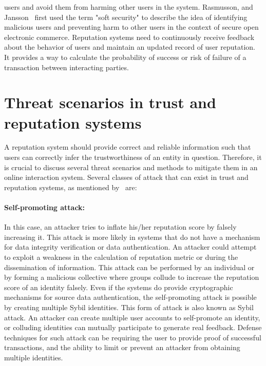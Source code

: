 users and avoid them from harming other users in the system. Rasmusson, and
Jansson~\cite{rasmusson1996simulated} first used the term "soft security" to
describe the idea of identifying malicious users and preventing harm to other
users in the context of secure open electronic commerce. Reputation systems
need to continuously receive feedback about the behavior of users and maintain
an updated record of user reputation. It provides a way to calculate the
probability of success or risk of failure of a transaction between interacting
parties.
\section{Threat scenarios in trust and reputation systems}
A reputation system should provide correct and reliable information such that
users can correctly infer the trustworthiness of an entity in question.
Therefore, it is crucial to discuss several threat scenarios and methods to
mitigate them in an online interaction system. Several classes of attack that
can exist in trust and reputation systems, as mentioned
by~\cite{hoffman2009survey,marmol2009security} are:  
\paragraph{Self-promoting attack:} In this case, an attacker tries to inflate
his/her reputation score by falsely increasing it. This attack is more likely
in systems that do not have a mechanism for data integrity verification or data
authentication. An attacker could attempt to exploit a weakness in the
calculation of reputation metric or during the dissemination of information.
This attack can be performed by an individual or by forming a malicious
collective where groups collude to increase the reputation score of an identity
falsely. Even if the systems do provide cryptographic mechanisms for source
data authentication, the self-promoting attack is possible by creating multiple
Sybil identities. This form of attack is also known as Sybil attack. An
attacker can create multiple user accounts to self-promote an identity, or
colluding identities can mutually participate to generate real feedback.
Defense techniques for such attack can be requiring the user to provide proof
of successful transactions, and the ability to limit or prevent an attacker
from obtaining multiple identities. 
